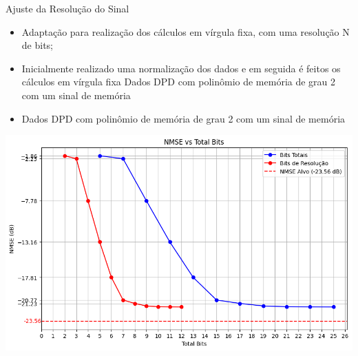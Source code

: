 \documentclass{if-beamer}
\begin{document}
\begin{frame}{Ajuste da Resolução do Sinal}
	\begin{minipage}{0.5\textwidth}
		\begin{itemize}
			\item Adaptação para realização dos cálculos em vírgula fixa, com uma resolução N de bits;
			\item Inicialmente realizado uma normalização dos dados e em seguida é feitos os cálculos em vírgula fixa Dados DPD com polinômio de memória de grau 2 com um sinal de memória
			\item  Dados DPD com polinômio 	de memória de grau 2 com 
			um sinal de memória
		\end{itemize}
	
		
	\end{minipage}%
	\hspace{0.04\textwidth}
	\begin{minipage}{0.5\textwidth}
	\includegraphics[scale=0.25]{bits.png}
	\end{minipage}
\end{frame}
\end{document}
